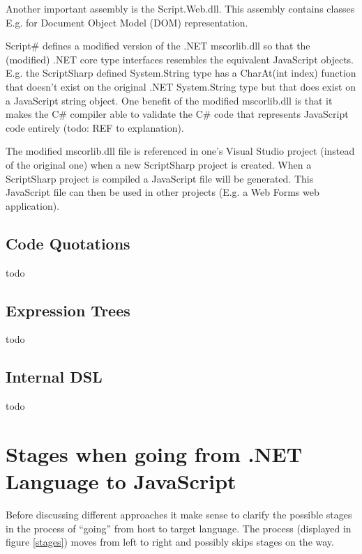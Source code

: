 		Another important assembly is the Script.Web.dll. This assembly contains classes E.g. for Document Object Model (DOM) representation.

		Script\# defines a modified version of the .NET mscorlib.dll so that the (modified) .NET core type interfaces resembles the equivalent JavaScript objects. E.g. the ScriptSharp defined System.String type has a CharAt(int index) function that doesn’t exist on the original .NET System.String type but that does exist on a JavaScript string object. One benefit of the modified mscorlib.dll is that it makes the C\# compiler able to validate the C\# code that represents JavaScript code entirely (todo: REF to explanation). 

		The modified mscorlib.dll file is referenced in one’s Visual Studio project (instead of the original one) when a new ScriptSharp project is created. When a ScriptSharp project is compiled a JavaScript file will be generated. This JavaScript file can then be used in other projects (E.g. a Web Forms web application).

	



	\subsection{Code Quotations} %
	\label{ssub:code_quotations}
		todo

	\subsection{Expression Trees} %
	\label{ssub:expression_trees}
		todo

	\subsection{Internal DSL} %
	\label{ssub:internal_dsl}
		todo

\section{Stages when going from .NET Language to JavaScript} %
\label{sec:stages_when_going_from_net_language_to_javascript}
	Before discussing different approaches it make sense to clarify the possible stages in the process of “going” from host to target language. The process (displayed in figure \ref{stages}) moves from left to right and possibly skips stages on the way.

